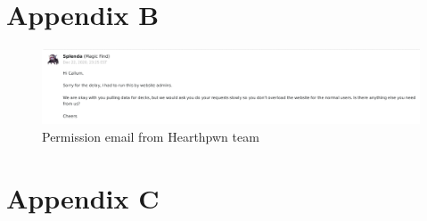 \documentclass{report} %
\begin{document}
\section*{Appendix B}
\begin{figure}[h]
\centering
\includegraphics[width=1.25\textwidth]{permission}
\captionsetup{labelformat=empty}
\caption{Permission email from Hearthpwn team\protect\footnotemark}
 \label{board}
\end{figure}

\section*{Appendix C}

\end{document}
